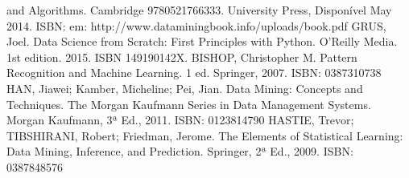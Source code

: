 {and Algorithms. Cambridge 9780521766333. University Press, Disponível
May 2014. ISBN: em: http://www.dataminingbook.info/uploads/book.pdf
\newline \newline 
GRUS, Joel. Data Science from Scratch: First Principles with Python. O'Reilly
Media. 1st edition. 2015. ISBN 149190142X.
\newline \newline 
BISHOP, Christopher M. Pattern Recognition and Machine Learning. 1 ed.
Springer, 2007. ISBN: 0387310738
\newline \newline 
HAN, Jiawei; Kamber, Micheline; Pei, Jian. Data Mining: Concepts and
Techniques. The Morgan Kaufmann Series in Data Management Systems.
Morgan Kaufmann, 3ª Ed., 2011. ISBN: 0123814790
\newline \newline 
HASTIE, Trevor; TIBSHIRANI, Robert; Friedman, Jerome. The Elements of
Statistical Learning: Data Mining, Inference, and Prediction. Springer, 2ª Ed.,
2009. ISBN: 0387848576
}



